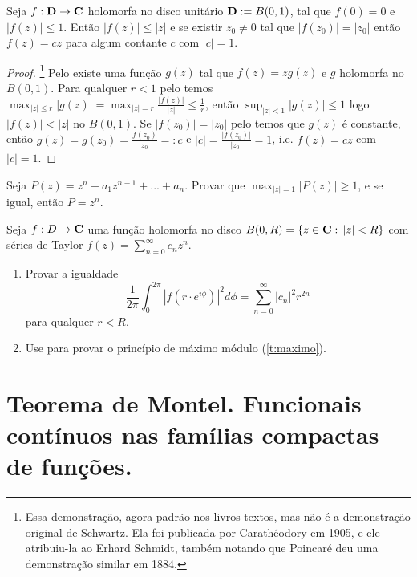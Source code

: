 \begin{lema}[Schwartz, 1869]
Seja $f : \mathbf{D} \to \mathbf{C}$ holomorfa no disco unitário $\mathbf{D} := B(0,1)$,
tal que $f(0) = 0$ e $|f(z)| \leq 1$. Então $|f(z)|\leq|z|$
e se existir $z_0\neq 0$ tal que $|f(z_0)| = |z_0|$ então $f(z) = c z$ para algum contante $c$ com
$|c|=1$.
\end{lema}
\begin{proof}\footnote{Essa demonstração, agora padrão nos livros textos,
mas não é a demonstração original de Schwartz.
Ela foi publicada por Carathéodory em 1905,
e ele atribuiu-la ao Erhard Schmidt, também notando que Poincaré deu
uma demonstração similar em 1884.}
Pelo  existe uma função $g(z)$ tal que $f(z) = z g(z)$ e $g$ holomorfa no $B(0,1)$.
Para qualquer $r<1$ pelo  temos
$\max_{|z|\leq r} |g(z)| = \max_{|z|=r} \frac{|f(z)|}{|z|} \leq \frac1{r}$,
então $\sup_{|z|<1} |g(z)|\leq 1$ logo $|f(z)|<|z|$ no $B(0,1)$.
Se $|f(z_0)| = |z_0|$ pelo  temos que $g(z)$ é constante,
então $g(z) = g(z_0) = \frac{f(z_0)}{z_0} =:c$ e $|c| = \frac{|f(z_0)|}{|z_0|} = 1$,
i.e. $f(z) = c z$ com $|c|=1$.
\end{proof}


\begin{problema}
Seja $P(z) = z^n + a_1 z^{n-1} + ... + a_n$.
Provar que $\max_{|z|=1} |P(z)| \geq 1$,
e se igual, então $P = z^n$.
\end{problema}

\begin{problema}
\label{p:l2}
Seja $f : D \to \mathbf{C}$ uma função holomorfa no disco $B(0,R) = \{z\in\mathbf{C}:\, |z|<R \}$
com séries de Taylor $f(z) = \sum_{n=0}^\infty c_n z^n$.
\begin{enumerate}
\item Provar a igualdade
\begin{equation}
\label{eq:l2}
\frac{1}{2\pi} \int_0^{2\pi} |f(r\cdot e^{i\phi})|^2 d\phi = \sum_{n=0}^\infty |c_n|^2 r^{2n} 
\end{equation}
 para qualquer $r < R$.
\item Use  para provar o princípio de máximo módulo (\cref{t:maximo}).
\end{enumerate}
\end{problema}

\section{Teorema de Montel. Funcionais contínuos nas famílias compactas de funções.}

